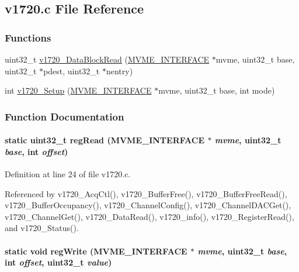 \subsection{v1720.c File Reference}
\label{v1720_8c}
\subsubsection*{Functions}
\begin{DoxyCompactItemize}
\item 
uint32\_\-t \hyperlink{v1720_8c_acdd23caf89523068021f92e2e5fc6f07}{v1720\_\-DataBlockRead} (\hyperlink{structMVME__INTERFACE}{MVME\_\-INTERFACE} $\ast$mvme, uint32\_\-t base, uint32\_\-t $\ast$pdest, uint32\_\-t $\ast$nentry)
\item 
int \hyperlink{v1720_8c_aa545f02c37aff141a08242cad65507e7}{v1720\_\-Setup} (\hyperlink{structMVME__INTERFACE}{MVME\_\-INTERFACE} $\ast$mvme, uint32\_\-t base, int mode)
\end{DoxyCompactItemize}


\subsubsection{Function Documentation}
\paragraph[{regRead}]{\setlength{\rightskip}{0pt plus 5cm}static uint32\_\-t regRead ({\bf MVME\_\-INTERFACE} $\ast$ {\em mvme}, \/  uint32\_\-t {\em base}, \/  int {\em offset})}\hfill\label{v1720_8c_a2296a7241a9fb55be401fb5c9845c7b7}


Definition at line 24 of file v1720.c.

Referenced by v1720\_\-AcqCtl(), v1720\_\-BufferFree(), v1720\_\-BufferFreeRead(), v1720\_\-BufferOccupancy(), v1720\_\-ChannelConfig(), v1720\_\-ChannelDACGet(), v1720\_\-ChannelGet(), v1720\_\-DataRead(), v1720\_\-info(), v1720\_\-RegisterRead(), and v1720\_\-Status().
\paragraph[{regWrite}]{\setlength{\rightskip}{0pt plus 5cm}static void regWrite ({\bf MVME\_\-INTERFACE} $\ast$ {\em mvme}, \/  uint32\_\-t {\em base}, \/  int {\em offset}, \/  uint32\_\-t {\em value})}\hfill\label{v1720_8c_af268fb97f4bcf3a3c0d4e2839c5a2a93}


